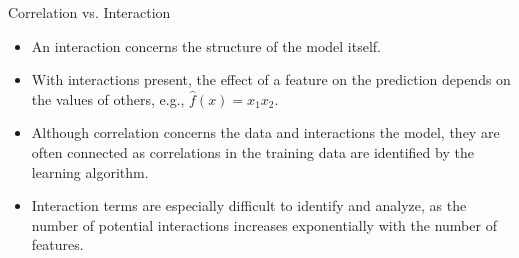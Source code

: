 \documentclass[11pt,compress,t,notes=noshow, aspectratio=169, xcolor=table]{beamer}
\begin{document}



\begin{frame}{Correlation vs. Interaction}
\begin{itemize}
\item An interaction concerns the structure of the model itself.
\item With interactions present, the effect of a feature on the prediction depends on the values of others, e.g., $\widehat{f}(x) = x_1 x_2$.
\item Although correlation concerns the data and interactions the model, they are often connected as correlations in the training data are identified by the learning algorithm.
\item Interaction terms are especially difficult to identify and analyze, as the number of potential interactions increases exponentially with the number of features.
\end{itemize}
\end{frame}
\end{document}
